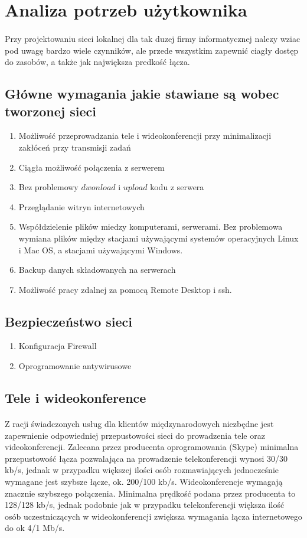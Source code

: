 \section{Analiza potrzeb użytkownika}
\paragraph{}
Przy projektowaniu sieci lokalnej dla tak duzej firmy informatycznej nalezy wziac pod uwagę bardzo
wiele czynników, ale przede wszystkim zapewnić ciagły dostęp do zasobów, a także jak największa predkość
łącza.
\subsection{Główne wymagania jakie stawiane są wobec tworzonej sieci}
\begin{enumerate}
	\item Możliwość przeprowadzania tele i wideokonferencji przy minimalizacji zakłóceń przy transmisji zadań
	\item Ciągła możliwość połączenia z serwerem
	\item Bez problemowy $dwonload$ i $upload$ kodu z serwera
	\item Przeglądanie witryn internetowych
	\item Współdzielenie plików miedzy komputerami, serwerami. Bez problemowa wymiana plików między stacjami używającymi systemów operacyjnych Linux i Mac OS, a stacjami używającymi Windows.
	\item Backup danych składowanych na serwerach
	\item Możliwość pracy zdalnej za pomocą Remote Desktop i ssh.
\end{enumerate}

\subsection{Bezpieczeństwo sieci}
\begin{enumerate}
	\item Konfiguracja Firewall
	\item Oprogramowanie antywirusowe
\end{enumerate}

\subsection{Tele i wideokonference}
\paragraph{}
Z racji świadczonych usług dla klientów międzynarodowych niezbędne jest zapewnienie odpowiedniej przepustowości sieci do prowadzenia tele oraz videokonferencji. Zalecana przez producenta oprogramowania (Skype) minimalna przepustowość łącza pozwalająca na prowadzenie telekonferencji wynosi 30/30 kb/s, jednak w przypadku większej ilości osób rozmawiających jednocześnie wymagane jest szybsze łącze, ok. 200/100 kb/s. Wideokonferencje wymagają znacznie szybszego połączenia. Minimalna prędkość podana przez producenta to 128/128 kb/s, jednak podobnie jak w przypadku telekonferencji większa ilość osób uczestniczących w wideokonferencji zwiększa wymagania łącza internetowego do ok 4/1 Mb/s.
